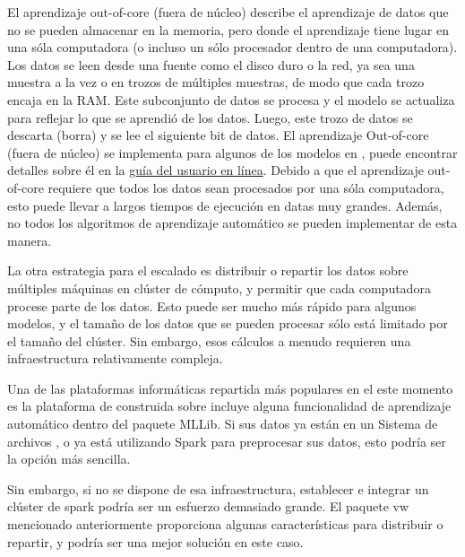    
El aprendizaje  out-of-core (fuera de núcleo)   describe el aprendizaje de datos que no se 
pueden almacenar en la memoria, pero donde el aprendizaje tiene lugar en una sóla computadora
 (o incluso un sólo procesador dentro de una computadora).  
Los datos se leen desde una fuente como el disco duro o la red, ya sea una muestra a la vez o en trozos de múltiples muestras, de modo que cada trozo encaja en la RAM. Este subconjunto de datos se procesa y el modelo se actualiza para reflejar lo que se aprendió de los datos.  Luego, este trozo de datos se descarta (borra) y se lee el siguiente bit de datos.    El aprendizaje  Out-of-core  (fuera de núcleo) se implementa para algunos de los modelos en {}, puede encontrar detalles sobre él en la 
\href{https://scikit-learn.org/stable/modules/scaling_strategies.html#scaling-with-instances-using-out-of-core-learning}{\textcolor{vino}{guía del usuario en línea}}.
Debido a que el aprendizaje   out-of-core  requiere que todos los datos sean procesados por una sóla computadora, esto puede llevar a largos tiempos de ejecución en datas muy grandes. Además, no todos los algoritmos de aprendizaje automático se pueden implementar de esta manera.


La otra estrategia para el escalado es distribuir o repartir  los datos sobre múltiples máquinas en  clúster de cómputo, y permitir que cada computadora procese parte de los datos. Esto puede ser mucho más rápido para algunos modelos, y el tamaño de los datos que se pueden procesar sólo está limitado por el tamaño del clúster. Sin embargo, esos cálculos a menudo requieren una infraestructura relativamente compleja.
 

Una de las plataformas informáticas repartida más populares en
el este  momento es la plataforma  de {}  construida sobre {}  incluye  alguna  funcionalidad  de  aprendizaje  automático dentro del paquete {\ttfamily MLLib}.  Si sus datos ya están en un Sistema de archivos  {}, o ya está utilizando {\ttfamily Spark } para preprocesar sus datos, esto podría ser la opción más sencilla. 



Sin embargo, si no se dispone  de esa infraestructura, establecer e integrar un   clúster de {\ttfamily spark} podría ser un esfuerzo demasiado grande. El paquete {\ttfamily vw} mencionado anteriormente proporciona algunas características para distribuir o  repartir,  y podría ser una mejor solución en este caso.


